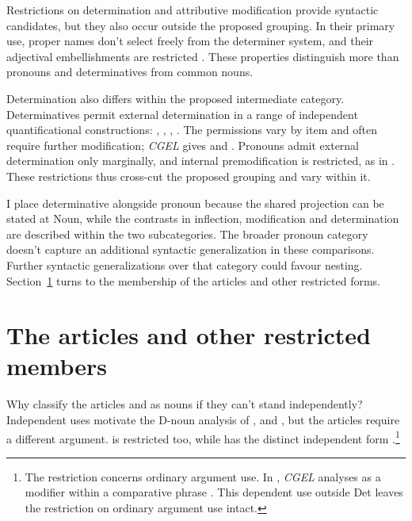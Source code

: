 \documentclass[12pt]{article}
\begin{document}
Restrictions on determination and attributive modification provide syntactic candidates, but they also occur outside the proposed grouping. In their primary use, proper names don't select freely from the determiner system, and their adjectival embellishments are restricted \citep[517, 519--520]{huddleston2002}. These properties distinguish more than pronouns and determinatives from common nouns.

Determination also differs within the proposed intermediate category. Determinatives permit external determination in a range of independent quantificational constructions: , , , . The permissions vary by item and often require further modification; \textit{CGEL} gives  and  \citep[415--416]{huddleston2002}. Pronouns admit external determination only marginally, and internal premodification is restricted, as in  \citep[429--430]{huddleston2002}. These restrictions thus cross-cut the proposed grouping and vary within it.

I place determinative alongside pronoun because the shared projection can be stated at Noun, while the contrasts in inflection, modification and determination are described within the two subcategories. The broader pronoun category doesn't capture an additional syntactic generalization in these comparisons. Further syntactic generalizations over that category could favour nesting. Section~\ref{sec:articles} turns to the membership of the articles and other restricted forms.

\section{The articles and other restricted members}\label{sec:articles}

Why classify the articles  and  as nouns if they can't stand independently? Independent uses motivate the D-noun analysis of ,  and , but the articles require a different argument.  is restricted too, while  has the distinct independent form  \citep[371--372, 410--411]{huddleston2002}.\footnote{The restriction concerns ordinary argument use. In , \textit{CGEL} analyses  as a modifier within a comparative phrase \citep[1131--1132, 1135--1136]{huddleston2002}. This dependent use outside Det leaves the restriction on ordinary argument use intact.}
\end{document}
